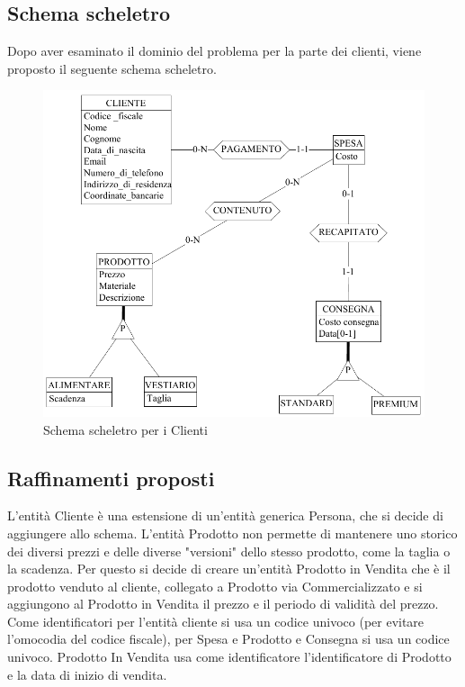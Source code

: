 \documentclass[a4paper,12pt]{report}
\begin{document}
\subsection{Schema scheletro}
Dopo aver esaminato il dominio del problema per la parte dei clienti, viene proposto il seguente schema scheletro.
\begin{figure}[H]
	\centering{}
	\includegraphics[width=\textwidth]{img/SchemaConcettuale-Clienti1.pdf}
	\caption{Schema scheletro per i Clienti}
\end{figure}
\subsection{Raffinamenti proposti}
L'entità Cliente è una estensione di un'entità generica Persona, che si decide di aggiungere allo schema. 
L'entità Prodotto non permette di mantenere uno storico dei diversi prezzi e delle diverse "versioni" dello stesso prodotto, come la taglia o la scadenza. 
Per questo si decide di creare un'entità Prodotto in Vendita che è il prodotto venduto al cliente, collegato a Prodotto via Commercializzato e si aggiungono al Prodotto in Vendita il prezzo e il periodo di validità del prezzo. 
Come identificatori per l'entità cliente si usa un codice univoco (per evitare l'omocodia del codice fiscale), per Spesa e Prodotto e Consegna si usa un codice univoco. Prodotto In Vendita usa come identificatore l'identificatore di Prodotto e la data di inizio di vendita.
\end{document}
